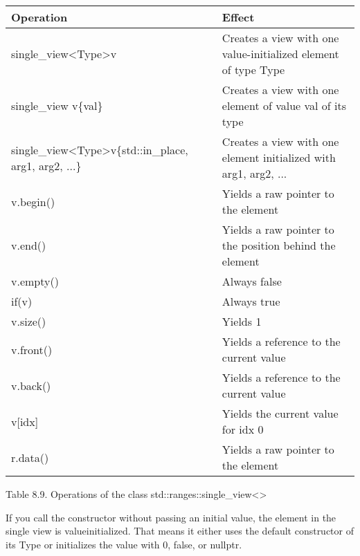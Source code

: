 \begin{longtable}[c]{|l|l|}
\hline
\textbf{Operation} & \textbf{Effect}                                         \\ \hline
\endfirsthead
%
\endhead
%
single\_view\textless{}Type\textgreater v                                    & Creates a view with one value-initialized element of type Type   \\ \hline
single\_view v\{val\}                                                        & Creates a view with one element of value val of its type         \\ \hline
single\_view\textless{}Type\textgreater v\{std::in\_place, arg1, arg2, ...\} & Creates a view with one element initialized with arg1, arg2, ... \\ \hline
v.begin()          & Yields a raw pointer to the element                     \\ \hline
v.end()            & Yields a raw pointer to the position behind the element \\ \hline
v.empty()          & Always false                                            \\ \hline
if(v)              & Always true                                             \\ \hline
v.size()           & Yields 1                                                \\ \hline
v.front()          & Yields a reference to the current value                 \\ \hline
v.back()           & Yields a reference to the current value                 \\ \hline
v{[}idx{]}         & Yields the current value for idx 0                      \\ \hline
r.data()           & Yields a raw pointer to the element                     \\ \hline
\end{longtable}

\begin{center}
Table 8.9. Operations of the class std::ranges::single\_view<>
\end{center}

If you call the constructor without passing an initial value, the element in the single view is valueinitialized. That means it either uses the default constructor of its Type or initializes the value with 0, false, or nullptr.

